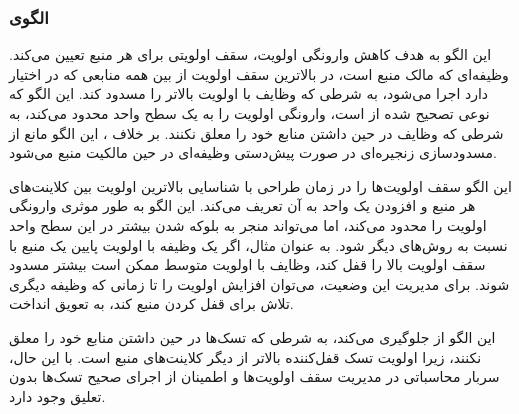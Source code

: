 \subsubsection{الگوی }
\label{resourceHighestLockerSec}
\begin{RTL}
این الگو \cite{ref4}
به هدف کاهش وارونگی اولویت، سقف اولویتی برای هر منبع تعیین می‌کند.
وظیفه‌ای که مالک منبع است، در بالاترین سقف اولویت از بین همه
منابعی که در اختیار دارد اجرا می‌شود، به شرطی که وظایف
با اولویت بالاتر را مسدود کند. این الگو که نوعی تصحیح شده از
 است، وارونگی اولویت را به یک سطح
واحد محدود می‌کند، به شرطی که وظایف در حین داشتن منابع خود را معلق نکنند.
بر خلاف ، این الگو مانع از مسدودسازی
زنجیره‌ای در صورت پیش‌دستی وظیفه‌ای در حین مالکیت منبع می‌شود.
\end{RTL}
\begin{RTL}
این الگو سقف اولویت‌ها را در زمان طراحی با شناسایی بالاترین اولویت
بین کلاینت‌های هر منبع و افزودن یک واحد به آن تعریف می‌کند.
این الگو به طور موثری وارونگی اولویت را محدود می‌کند، اما می‌تواند منجر
به بلوکه شدن بیشتر در این سطح واحد نسبت به روش‌های دیگر شود.
به عنوان مثال، اگر یک وظیفه با اولویت پایین یک منبع با سقف اولویت بالا
را قفل کند، وظایف با اولویت متوسط ممکن است بیشتر مسدود شوند.
برای مدیریت این وضعیت، می‌توان افزایش اولویت را تا زمانی که
وظیفه دیگری تلاش برای قفل کردن منبع کند، به تعویق انداخت.
\end{RTL}
\begin{RTL}
این الگو از  جلوگیری می‌کند،
به شرطی که تسک‌ها در حین داشتن منابع خود را معلق نکنند،
زیرا اولویت تسک قفل‌کننده بالاتر از دیگر کلاینت‌های منبع است.
با این حال، سربار محاسباتی در مدیریت سقف اولویت‌ها
و اطمینان از اجرای صحیح تسک‌ها بدون تعلیق وجود دارد.
\end{RTL}
